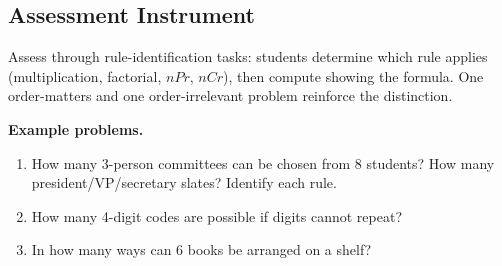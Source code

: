 \subsection{Assessment Instrument}
\label{ssec:asse-3669}


Assess through rule-identification tasks: students determine which rule
applies (multiplication, factorial, $nPr$, $nCr$), then compute showing
the formula. One order-matters and one order-irrelevant problem reinforce
the distinction.

\textbf{Example problems.}
\begin{enumerate}
    \item How many 3-person committees can be chosen from 8 students?
          How many president/VP/secretary slates? Identify each rule.
    \item How many 4-digit codes are possible if digits cannot repeat?
    \item In how many ways can 6 books be arranged on a shelf?
\end{enumerate}